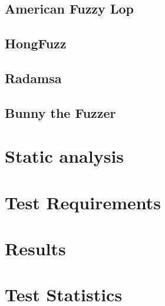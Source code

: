 \subsection{American Fuzzy Lop}
\subsection{HongFuzz}
\subsection{Radamsa}
\subsection{Bunny the Fuzzer}

\section{Static analysis}

\section{Test Requirements}
\section{Results}
\section{Test Statistics}


